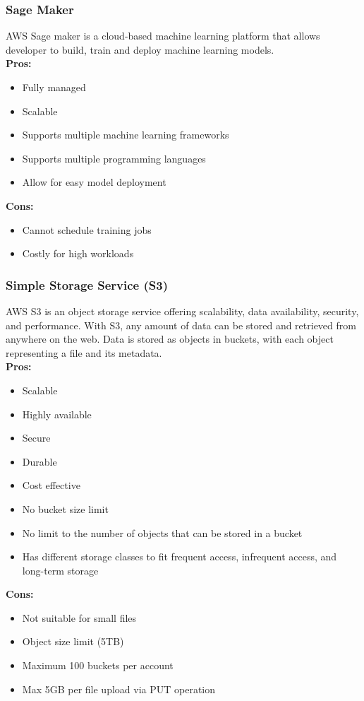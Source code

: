         \subsubsection{Sage Maker}
        \label{aws:sage-maker}
        AWS Sage maker is a cloud-based machine learning platform that allows developer to build, train and deploy machine learning models.\\
        \textbf{Pros:}
        \begin{itemize}
            \item Fully managed
            \item Scalable
            \item Supports multiple machine learning frameworks
            \item Supports multiple programming languages
            \item Allow for easy model deployment
        \end{itemize}
        \textbf{Cons:}
        \begin{itemize}
            \item Cannot schedule training jobs
            \item Costly for high workloads
        \end{itemize}

        \subsubsection{Simple Storage Service (S3)} 
        \label{aws:s3}
        AWS S3 is an object storage service offering scalability, data availability, security, and performance.
        With S3, any amount of data can be stored and retrieved from anywhere on the web. 
        Data is stored as objects in buckets, with each object representing a file and its metadata.\\
        \textbf{Pros:}
        \begin{itemize}
            \item Scalable
            \item Highly available
            \item Secure
            \item Durable
            \item Cost effective
            \item No bucket size limit
            \item No limit to the number of objects that can be stored in a bucket
            \item Has different storage classes to fit frequent access, infrequent access, and long-term storage
        \end{itemize}
        \textbf{Cons:}
        \begin{itemize}
            \item Not suitable for small files
            \item Object size limit (5TB)
            \item Maximum 100 buckets per account
            \item Max 5GB per file upload via PUT operation
        \end{itemize}


